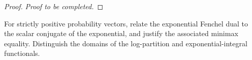 \documentclass[12pt,a4paper,oneside]{book}
\begin{document}
\begin{proof}
\noindent\textit{Proof to be completed.}
\end{proof}



\begin{Question}
For strictly positive probability vectors, relate the exponential Fenchel dual to the scalar conjugate of the exponential, and justify the associated minimax equality. Distinguish the domains of the log-partition and exponential-integral functionals.
\end{Question}
%
\end{document}
